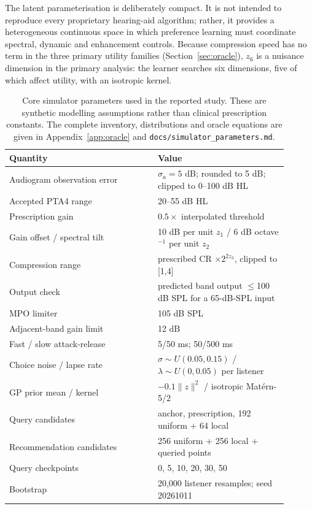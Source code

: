 \documentclass[preprint,12pt]{elsarticle}
\begin{document}
The latent parameterisation is deliberately compact. It is not intended to reproduce every proprietary hearing-aid algorithm; rather, it provides a heterogeneous continuous space in which preference learning must coordinate spectral, dynamic and enhancement controls. Because compression speed has no term in the three primary utility families (Section~\ref{sec:oracle}), $z_6$ is a nuisance dimension in the primary analysis: the learner searches six dimensions, five of which affect utility, with an isotropic kernel.

\begin{table}[!htbp]
\centering
\caption{Core simulator parameters used in the reported study. These are synthetic modelling assumptions rather than clinical prescription constants. The complete inventory, distributions and oracle equations are given in Appendix~\ref{app:oracle} and \texttt{docs/simulator\_parameters.md}.}
\label{tab:simparams}
\small
\begin{tabular}{p{0.48\linewidth}p{0.42\linewidth}}
\toprule
Quantity & Value \\
\midrule
Audiogram observation error & $\sigma_a=5$ dB; rounded to 5 dB; clipped to 0--100 dB HL \\
Accepted PTA4 range & 20--55 dB HL \\
Prescription gain & $0.5\times$ interpolated threshold \\
Gain offset / spectral tilt & 10 dB per unit $z_1$ / 6 dB octave$^{-1}$ per unit $z_2$ \\
Compression range & prescribed CR $\times 2^{2z_3}$, clipped to [1,4] \\
Output check & predicted band output $\le$100 dB SPL for a 65-dB-SPL input \\
MPO limiter & 105 dB SPL \\
Adjacent-band gain limit & 12 dB \\
Fast / slow attack-release & 5/50 ms; 50/500 ms \\
Choice noise / lapse rate & $\sigma\sim U(0.05,0.15)$ / $\lambda\sim U(0,0.05)$ per listener \\
GP prior mean / kernel & $-0.1\|z\|^2$ / isotropic Mat\'ern-5/2 \\
Query candidates & anchor, prescription, 192 uniform + 64 local \\
Recommendation candidates & 256 uniform + 256 local + queried points \\
Query checkpoints & 0, 5, 10, 20, 30, 50 \\
Bootstrap & 20,000 listener resamples; seed 20261011 \\
\bottomrule
\end{tabular}
\end{table}
\end{document}
